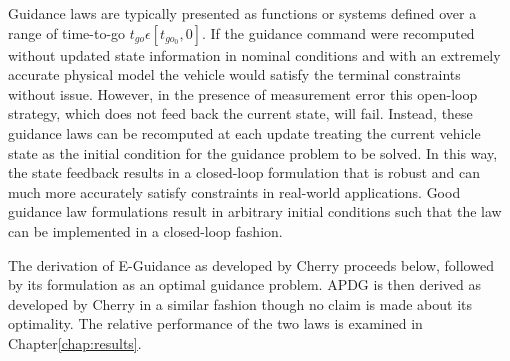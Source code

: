 Guidance laws are typically presented as functions or systems defined over a range of time-to-go $t_{go} \epsilon [t_{go_0}, 0]$. If the guidance command were recomputed without updated state information in nominal conditions and with an extremely accurate physical model the vehicle would satisfy the terminal constraints without issue. However, in the presence of measurement error this open-loop strategy, which does not feed back the current state, will fail. Instead, these guidance laws can be recomputed at each update treating the current vehicle state as the initial condition for the guidance problem to be solved. In this way, the state feedback results in a closed-loop formulation that is robust and can much more accurately satisfy constraints in real-world applications. Good guidance law formulations result in arbitrary initial conditions such that the law can be implemented in a closed-loop fashion.

The derivation of E-Guidance as developed by Cherry proceeds below, followed by its formulation as an optimal guidance problem. APDG is then derived as developed by Cherry in a similar fashion though no claim is made about its optimality. The relative performance of the two laws is examined in Chapter\:\ref{chap:results}.

%
%
%
%
%
%

